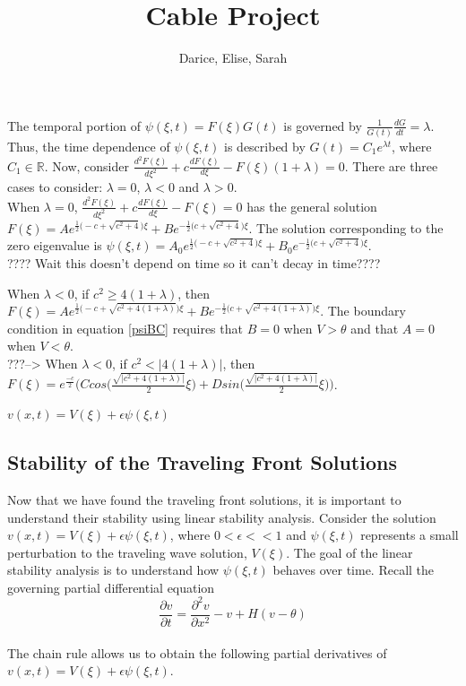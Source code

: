 \documentclass[12pt]{article}
\title{Cable Project}
\author{Darice, Elise, Sarah}
\begin{document}
\maketitle






The temporal portion of $\psi(\xi,t)=F(\xi)G(t)$ is governed by $\frac{1}{G(t)}\frac{dG}{dt}=\lambda$.
Thus, the time dependence of $\psi(\xi,t)$ is described by $G(t)=C_1e^{\lambda t}$, where $C_1\in\mathbb{R}$. Now, consider $\frac{d^2F(\xi)}{d\xi^2}+c\frac{dF(\xi)}{d\xi}-F(\xi)(1+\lambda)=0$. 
There are three cases to consider: $\lambda=0$, $\lambda<0$ and $\lambda>0$.\\

 When $\lambda=0$, $\frac{d^2F(\xi)}{d\xi^2}+c\frac{dF(\xi)}{d\xi}-F(\xi)=0$ has the general solution $F(\xi)=Ae^{\frac{1}{2}\big(-c+\sqrt{c^2+4}\big)\xi}+Be^{-\frac{1}{2}\big(c+\sqrt{c^2+4}\big)\xi}$. The solution corresponding to the zero eigenvalue is $\psi(\xi,t)=A_0e^{\frac{1}{2}\big(-c+\sqrt{c^2+4}\big)\xi}+B_0e^{-\frac{1}{2}\big(c+\sqrt{c^2+4}\big)\xi}$.\\
 ???? Wait this doesn't depend on time so it can't decay in time????
 
 
 When $\lambda<0$, if $c^2\geq4(1+\lambda)$, then $F(\xi)=Ae^{\frac{1}{2}\big(-c+\sqrt{c^2+4(1+\lambda)}\big)\xi}+Be^{-\frac{1}{2}\big(c+\sqrt{c^2+4(1+\lambda)}\big)\xi}$. The boundary condition in equation \ref{psiBC} requires that $B=0$ when $V>\theta$ and that $A=0$ when $V<\theta$. \\
 
 
 ???-->
 When $\lambda<0$, if $c^2<|4(1+\lambda)|$, then $F(\xi)=e^{\frac{-c}{2}}\Big(C cos\big(\frac{\sqrt{|c^2+4(1+\lambda)|}}{2}\xi\big)+D sin\big(\frac{\sqrt{|c^2+4(1+\lambda)|}}{2}\xi\big)\Big)$.
 
 
$v(x,t)=V(\xi)+\epsilon\psi(\xi,t)$






\subsection{Stability of the Traveling Front Solutions}
Now that we have found the traveling front solutions, it is important to understand their stability using linear stability analysis. Consider the solution $v(x,t)=V(\xi)+\epsilon\psi(\xi,t)$, where $0 < \epsilon <<1$ and $\psi(\xi,t)$ represents a small perturbation to the traveling wave solution, $V(\xi)$. The goal of the linear stability analysis is to understand how $\psi(\xi,t)$ behaves over time. Recall the governing partial differential equation
\begin{equation}
\label{uh}
\frac{\partial v}{\partial t}=\frac{\partial ^2 v}{\partial x^2}-v+H(v-\theta)
\end{equation}
\\
The chain rule allows us to obtain the following partial derivatives of $v(x,t)=V(\xi)+\epsilon\psi(\xi,t)$.
\end{document}
